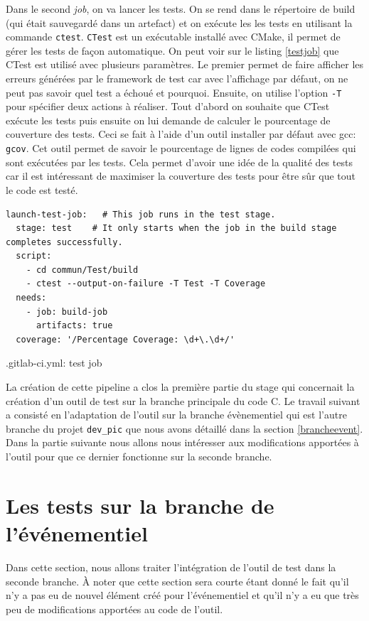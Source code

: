 \documentclass[a4paper]{article}
\begin{document}
Dans le second \textit{job}, on va lancer les tests. On se rend dans le
répertoire de build (qui était sauvegardé dans un artefact) et on exécute les
les tests en utilisant la commande \verb|ctest|. \verb|CTest| est un exécutable
installé avec CMake, il permet de gérer les tests de façon automatique. On peut
voir sur le listing \ref{testjob} que CTest est utilisé avec plusieurs
paramètres. Le premier permet de faire afficher les erreurs générées par le
framework de test car avec l'affichage par défaut, on ne peut pas savoir quel
test a échoué et pourquoi. Ensuite, on utilise l'option \verb|-T| pour spécifier
deux actions à réaliser. Tout d'abord on souhaite que CTest exécute les tests
puis ensuite on lui demande de calculer le pourcentage de couverture des tests.
Ceci se fait à l'aide d'un outil installer par défaut avec gcc: \verb|gcov|. Cet
outil permet de savoir le pourcentage de lignes de codes compilées qui sont
exécutées par les tests. Cela permet d'avoir une idée de la qualité des tests
car il est intéressant de maximiser la couverture des tests pour être sûr que
tout le code est testé.

\begin{listing}[ht!]
\begin{verbatim}
launch-test-job:   # This job runs in the test stage.
  stage: test    # It only starts when the job in the build stage completes successfully.
  script:
    - cd commun/Test/build
    - ctest --output-on-failure -T Test -T Coverage
  needs:
    - job: build-job
      artifacts: true
  coverage: '/Percentage Coverage: \d+\.\d+/'
\end{verbatim}
\caption{.gitlab-ci.yml: test job}
\label{testjob}
\end{listing}

La création de cette pipeline a clos la première partie du stage qui concernait
la création d'un outil de test sur la branche principale du code C. Le travail
suivant a consisté en l'adaptation de l'outil sur la branche évènementiel qui
est l'autre branche du projet \verb|dev_pic| que nous avons détaillé dans la
section \ref{brancheevent}. Dans la partie suivante nous allons nous intéresser
aux modifications apportées à l'outil pour que ce dernier fonctionne sur la
seconde branche.
\section{Les tests sur la branche de l'événementiel}%

Dans cette section, nous allons traiter l'intégration de l'outil de test dans la
seconde branche. À noter que cette section sera courte étant donné le fait qu'il
n'y a pas eu de nouvel élément créé pour l'événementiel et qu'il n'y a eu que
très peu de modifications apportées au code de l'outil.
\end{document}
